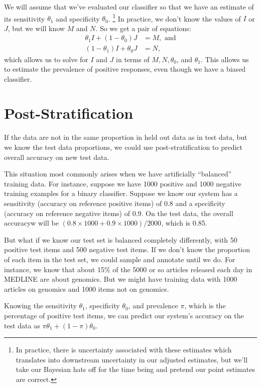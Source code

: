 We will assume that we've evaluated our classifier so that we have an estimate of its
sensitivity $\theta_1$ and specificity $\theta_0$.%
%
\footnote{In practice, there is uncertainty associated with these
estimates which translates into downstream uncertainty in our adjusted
estimates, but we'll take our Bayesian hats off for the time being and
pretend our point estimates are correct.}
%
In practice, we
don't know the values of $I$ or $J$, but we will know $M$ and $N$.  So
we get a pair of equations:
%
\begin{align}
\theta_1 I + (1-\theta_0) J &= M, \mbox{ and}
\\[4pt]
(1-\theta_1) I + \theta_0 J &= N,
\end{align}
%
which allows us to solve for $I$ and $J$ in terms of $M, N, \theta_0$,
and $\theta_1$.  This allows us to estimate the prevalence of positive
responses, even though we have a biased classifier.


\section{Post-Stratification}\label{section:classifier-eval-post-stratification}

If the data are not in the same proportion in held out data as in test
data, but we know the test data proportions, we could use
post-stratification to predict overall accuracy on new test data.  

This situation most commonly arises when we have artificially
``balanced'' training data.  For instance, suppose we have 1000
positive and 1000 negative training examples for a binary classifier.
Suppose we know our system has a sensitivity (accuracy on reference
positive items) of 0.8 and a specificity (accuracy on reference
negative items) of 0.9.   On the test data, the overall accuracyw
will be $(0.8 \times 1000 + 0.9 \times 1000)/2000$, which is 0.85.

But what if we know our test set is balanced completely differently,
with 50 positive test items and 500 negative test items.  If we don't
know the proportion of each item in the test set, we could sample and
annotate until we do.  For instance, we know that about 15\% of the
5000 or so articles released each day in MEDLINE are about genomics.
But we might have training data with 1000 articles on genomics
and 1000 items not on genomics.  

Knowing the sensitivity $\theta_1$, specificity $\theta_0$, and
prevalence $\pi$, which is the percentage of positive test items,
we can predict our system's accuracy on the test data as
$\pi \theta_1 + (1-\pi)\theta_0$.








